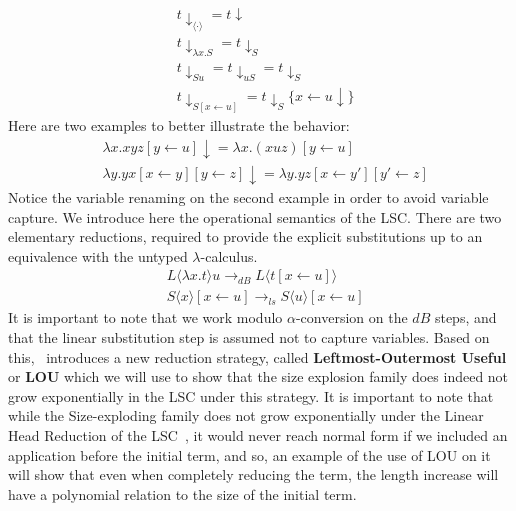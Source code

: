 \documentclass[11pt]{article}
\begin{document}
\begin{equation}
  \begin{split}
    &t\downarrow_{\langle \cdot \rangle} = t\downarrow \\
    &t\downarrow_{\lambda x.S} = t\downarrow_S \\
    &t\downarrow_{Su} = t\downarrow_{uS} = t\downarrow_S \\
    &t\downarrow_{S[x \leftarrow u]} = t\downarrow_S \{x \leftarrow u \downarrow \}
  \end{split}
\end{equation}
Here are two examples to better illustrate the behavior:
\begin{equation}
	\begin{split}
	& \lambda x . xyz[y \leftarrow u]\downarrow = \lambda x . (xuz)[y \leftarrow u] \\ 
	& \lambda y . yx [x \leftarrow y][y \leftarrow z]\downarrow = \lambda y.yz[x \leftarrow y'][y' \leftarrow z]
	\end{split}
\end{equation}
Notice the variable renaming on the second example in order to avoid variable capture.
We introduce here the operational semantics of the LSC. There are two elementary reductions, required to provide the explicit substitutions up to an equivalence with the untyped $\lambda$-calculus.
\begin{equation}
  \begin{split}
    &L \langle \lambda x .t \rangle u \rightarrow_{dB} L \langle t [x \leftarrow u] \rangle \\
    &S \langle x \rangle [x \leftarrow u] \rightarrow_{ls} S \langle u \rangle [x \leftarrow u]
  \end{split}
\end{equation}
It is important to note that we work modulo $\alpha$-conversion on the $dB$ steps, and that the linear substitution step is assumed not to capture variables.
Based on this,~\cite{beta-invariance} introduces a new reduction strategy, called \textbf{Leftmost-Outermost Useful} or \textbf{LOU} which we will use to show that the size explosion family does indeed not grow exponentially in the LSC under this strategy. It is important to note that while the Size-exploding family does not grow exponentially under the Linear Head Reduction of the LSC~\cite{invariance-of-cost-model}, it would never reach normal form if we included an application before the initial term, and so, an example of the use of LOU on it will show that even when completely reducing the term, the length increase will have a polynomial relation to the size of the initial term.
\end{document}
